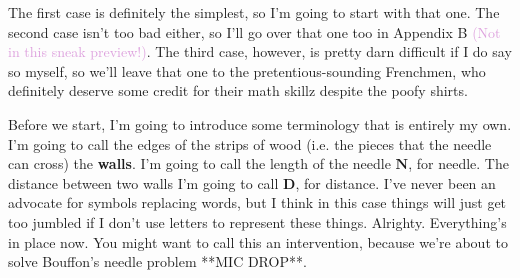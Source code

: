 \documentclass[11pt,titlepage]{article}
\begin{document}
The first case is definitely the simplest, so I'm going to start with that one. The second case isn't too bad either, so I'll go over that one too in Appendix B \textcolor{Plum}{(Not in this sneak preview!)}. The third case, however, is pretty darn difficult if I do say so myself, so we'll leave that one to the pretentious-sounding Frenchmen, who definitely deserve some credit for their math skillz despite the poofy shirts.

Before we start, I'm going to introduce some terminology that is entirely my own. I'm going to call the edges of the strips of wood (i.e. the pieces that the needle can cross) the \textbf{walls}. I'm going to call the length of the needle $\mathbf{N}$, for needle. The distance between two walls I'm going to call $\mathbf{D}$, for distance. I've never been an advocate for symbols replacing words, but I think in this case things will just get too jumbled if I don't use letters to represent these things. Alrighty. Everything's in place now. You might want to call this an intervention, because we're about to solve Bouffon's needle problem **MIC DROP**.
\end{document}

